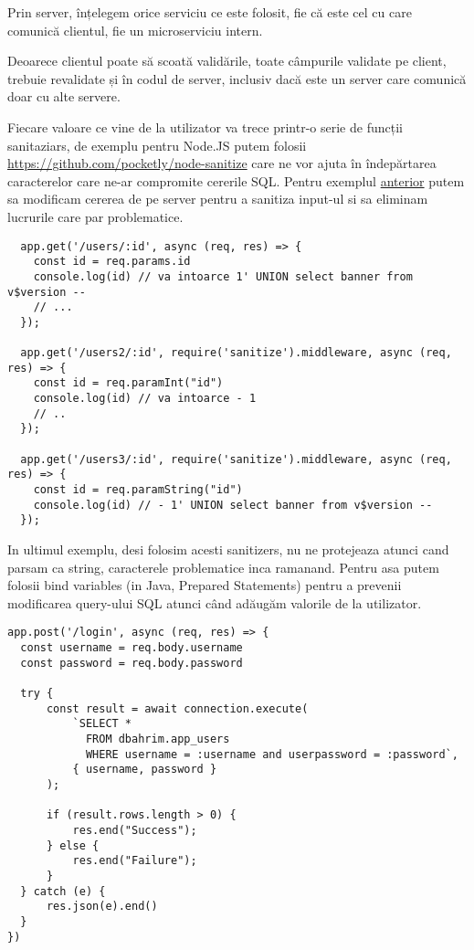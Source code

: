 \documentclass[12pt, a4paper]{report}
\begin{document}
Prin server, înțelegem orice serviciu ce este folosit, fie că este cel cu care comunică 
clientul, fie un microserviciu intern.

Deoarece clientul poate să scoată validările, toate câmpurile validate pe client, trebuie revalidate și în codul de server, inclusiv dacă este un server care comunică doar cu alte servere.

Fiecare valoare ce vine de la utilizator va trece printr-o serie de funcții sanitaziars,
de exemplu pentru Node.JS putem folosii \url{https://github.com/pocketly/node-sanitize}
care ne vor ajuta în îndepărtarea caracterelor care ne-ar compromite cererile SQL. Pentru exemplul 
\hyperref[exemplush1]{anterior} putem sa modificam cererea de pe server pentru a sanitiza input-ul si sa eliminam lucrurile care par problematice.

\lstset{language=JavaScript}
\begin{lstlisting}
  app.get('/users/:id', async (req, res) => {
    const id = req.params.id
    console.log(id) // va intoarce 1' UNION select banner from v$version --
    // ...
  });

  app.get('/users2/:id', require('sanitize').middleware, async (req, res) => {
    const id = req.paramInt("id")
    console.log(id) // va intoarce - 1
    // ..
  });

  app.get('/users3/:id', require('sanitize').middleware, async (req, res) => {
    const id = req.paramString("id")
    console.log(id) // - 1' UNION select banner from v$version --
  });
\end{lstlisting}

In ultimul exemplu, desi folosim acesti sanitizers, nu ne protejeaza atunci cand parsam ca string, caracterele problematice inca ramanand. 
Pentru asa putem folosii bind variables (in Java, Prepared Statements) 
pentru a prevenii modificarea query-ului SQL atunci când adăugăm valorile de la utilizator.

\lstset{language=JavaScript}
\begin{lstlisting}
app.post('/login', async (req, res) => {
  const username = req.body.username
  const password = req.body.password

  try {
      const result = await connection.execute(
          `SELECT *
            FROM dbahrim.app_users
            WHERE username = :username and userpassword = :password`,
          { username, password }
      );

      if (result.rows.length > 0) {
          res.end("Success");
      } else {
          res.end("Failure");
      }
  } catch (e) {
      res.json(e).end()
  }
})
\end{lstlisting}
\end{document}
